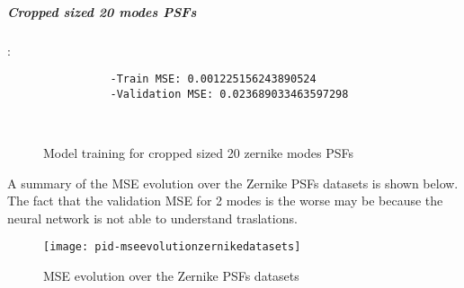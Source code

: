 		\subparagraph{Cropped sized 20 modes PSFs}:\\
		\begin{lstlisting}	
        		-Train MSE: 0.001225156243890524
        		-Validation MSE: 0.023689033463597298
		\end{lstlisting}
		
		\begin{figure*}[ht!]
			\hspace{\fill}
			\hspace{\fill}
			\\
			\caption{Model training for cropped sized 20 zernike modes PSFs}
		\end{figure*}
		\FloatBarrier
		
		A summary of the MSE evolution over the Zernike PSFs datasets is shown below. The fact that the validation MSE for 2 modes is the worse may be because the neural network is not able to understand traslations.
		\begin{figure*}[ht!]
			\centering
			\texttt{[image: pid-mseevolutionzernikedatasets]}
			\caption{MSE evolution over the Zernike PSFs datasets}
		\end{figure*}